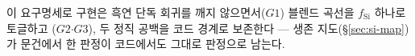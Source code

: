 이 요구명세로 구현은 흑연 단독 회귀를 깨지 않으면서($G1$) 블렌드 곡선을 $f_\mathrm{Si}$ 하나로 토글하고
($G2$$\cdot$$G3$), 두 정직 공백을 코드 경계로 보존한다 --- 생존 지도(\S\ref{sec:si-map})가 문건에서
한 판정이 코드에서도 그대로 판정으로 남는다.

